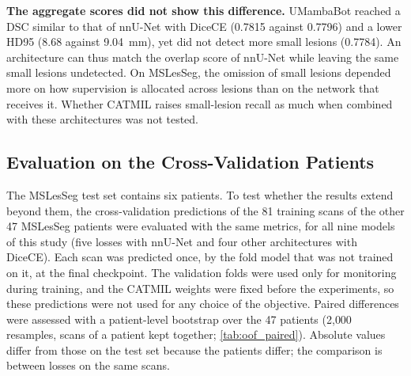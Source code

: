 \textbf{The aggregate scores did not show this difference.} UMambaBot
reached a DSC similar to that of nnU-Net with DiceCE (0.7815 against
0.7796) and a lower HD95 (8.68 against 9.04~mm), yet did not detect more
small lesions (0.7784). An architecture can thus match the overlap score
of nnU-Net while leaving the same small lesions undetected. On MSLesSeg,
the omission of small lesions depended more on how supervision is
allocated across lesions than on the network that receives it. Whether
CATMIL raises small-lesion recall as much when combined with these
architectures was not tested.

\subsection{Evaluation on the Cross-Validation Patients}
\label{sec:catmil_oof}

The MSLesSeg test set contains six patients. To test whether the results
extend beyond them, the cross-validation predictions of the 81 training
scans of the other 47 MSLesSeg patients were evaluated with the same
metrics, for all nine models of this study (five losses with nnU-Net and
four other architectures with DiceCE). Each scan was predicted once, by the
fold model that was not trained on it, at the final checkpoint. The validation folds were used only
for monitoring during training, and the CATMIL weights were fixed before
the experiments, so these predictions were not used for any choice of the
objective. Paired differences were assessed with a patient-level bootstrap
over the 47 patients (2{,}000 resamples, scans of a patient kept together;
\cref{tab:oof_paired}). Absolute values differ from those on the test set
because the patients differ; the comparison is between losses on the same
scans.

